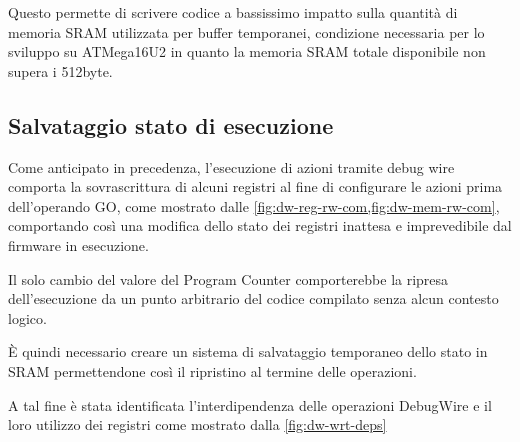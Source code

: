 Questo permette di scrivere codice a bassissimo impatto sulla quantità di memoria SRAM utilizzata per buffer temporanei, condizione necessaria per lo sviluppo su ATMega16U2 in quanto la memoria SRAM totale disponibile non supera i 512byte\cite{avr:m16u2}.

\subsection{Salvataggio stato di esecuzione}

Come anticipato in precedenza, l'esecuzione di azioni tramite debug wire comporta la sovrascrittura di alcuni registri al fine di configurare le azioni prima dell'operando GO, come mostrato dalle \cref{fig:dw-reg-rw-com,fig:dw-mem-rw-com}, comportando così una modifica dello stato dei registri inattesa e imprevedibile dal firmware in esecuzione.

Il solo cambio del valore del Program Counter comporterebbe la ripresa dell'esecuzione da un punto arbitrario del codice compilato senza alcun contesto logico.

È quindi necessario creare un sistema di salvataggio temporaneo dello stato in SRAM permettendone così il ripristino al termine delle operazioni.

A tal fine è stata identificata l'interdipendenza delle operazioni DebugWire e il loro utilizzo dei registri come mostrato dalla \cref{fig:dw-wrt-deps}

